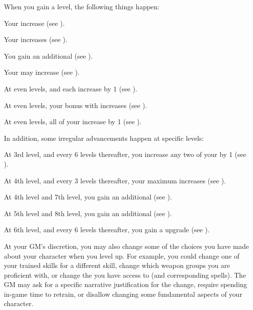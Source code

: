     When you gain a level, the following things happen:
    \begin{raggeditemize}
        \item Your  increase (see ).
        \item Your  increases (see ).
        \item You gain an additional  (see ).
        \item Your  may increase (see ).
        \item At even levels,  and  each increase by 1 (see ).
        \item At even levels, your bonus with  increases (see ).
        \item At even levels, all of your  increase by 1 (see ).
    \end{raggeditemize}

    In addition, some irregular advancements happen at specific levels:
    \begin{raggeditemize}
        \item At 3rd level, and every 6 levels thereafter, you increase any two of your  by 1 (see ).
        \item At 4th level, and every 3 levels thereafter, your maximum  increases (see ).
        \item At 4th level and 7th level, you gain an additional  (see ).
        \item At 5th level and 8th level, you gain an additional  (see ).
        \item At 6th level, and every 6 levels thereafter, you gain a  upgrade (see ).
    \end{raggeditemize}

    At your GM's discretion, you may also change some of the choices you have made about your character when you level up.
    For example, you could change one of your trained skills for a different skill, change which weapon groups you are proficient with, or change the  you have access to (and corresponding spells).
    The GM may ask for a specific narrative justification for the change, require spending in-game time to retrain, or disallow changing some fundamental aspects of your character.

